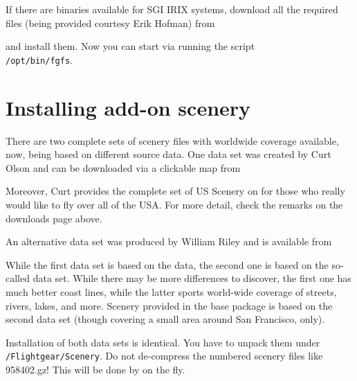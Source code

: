 If there are binaries available for SGI IRIX systems, download all the required files (being provided courtesy Erik Hofman)
from
 \medskip

 \medskip

 \noindent
 and install them. Now you can start \FlightGear{} via running the script\\
\texttt{/opt/bin/fgfs}.

\section{Installing add-on scenery}

There are two complete sets of scenery files with worldwide coverage available, now, being based on different source data. One data set was created by Curt Olson and can be downloaded via a clickable map from
 \medskip

 \medskip

 \noindent
Moreover, Curt provides the complete set of US Scenery on  for those who
really would like to fly over all of the USA. For more detail, check the remarks on the
downloads page above.

An alternative data set was produced by William Riley and is available from
\medskip

 \medskip

While the first data set is based on the  data, the second one is based on the so-called  data set. While there may be more differences to discover, the first one has much better coast lines, while the latter sports world-wide coverage of streets, rivers, lakes, and more. Scenery provided in the base package is based on the second data set (though covering a small area around San Francisco, only).

Installation of both data sets is identical. You have to unpack them under \texttt{/Flightgear/Scenery}. Do not de-compress the numbered scenery files like 958402.gz! This will be done by \FlightGear{} on the fly.

